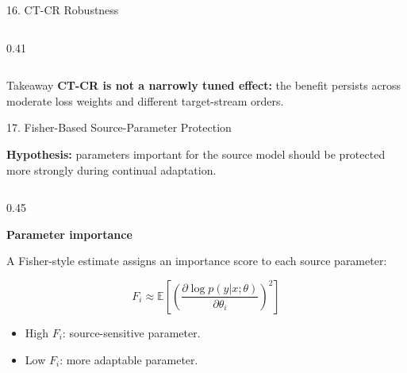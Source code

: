 \documentclass[aspectratio=169,11pt]{beamer}
\begin{document}
\begin{frame}{16. CT-CR Robustness}
\begin{columns}[T,onlytextwidth]
\begin{column}{0.41\textwidth}
\end{column}

\end{columns}

\vspace{-0.02cm}

\begin{block}{Takeaway}
\fontsize{6.0}{6.5}\selectfont
\textbf{CT-CR is not a narrowly tuned effect:}
the benefit persists across moderate loss weights and different
target-stream orders.
\end{block}

\end{frame}

\begin{frame}{17. Fisher-Based Source-Parameter Protection}

\footnotesize

\textbf{Hypothesis:}
parameters important for the source model should be protected more
strongly during continual adaptation.

\vspace{0.15em}

\begin{columns}[T,onlytextwidth]

\begin{column}{0.45\textwidth}

\textbf{Parameter importance}

\vspace{0.1em}

A Fisher-style estimate assigns an importance score to each source
parameter:

\vspace{-0.25em}

\[
F_i
\approx
\mathbb{E}
\left[
\left(
\frac{\partial \log p(y|x;\theta)}
{\partial \theta_i}
\right)^2
\right]
\]

\vspace{-0.45em}

\begin{itemize}
    \setlength{\itemsep}{1pt}
    \setlength{\parskip}{0pt}
    \setlength{\parsep}{0pt}
    \item High $F_i$: source-sensitive parameter.
    \item Low $F_i$: more adaptable parameter.
\end{itemize}

\end{column}


\end{columns}
\end{frame}
\end{document}
